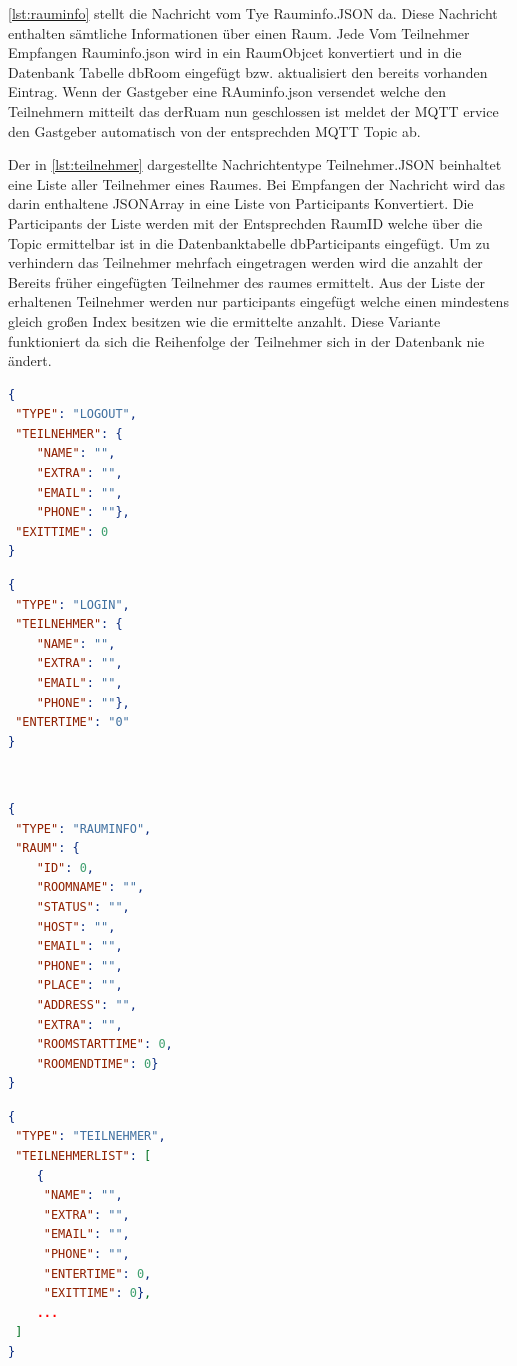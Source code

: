 \cref{lst:rauminfo} stellt die Nachricht vom Tye Rauminfo.JSON da. Diese Nachricht enthalten sämtliche Informationen über einen Raum. Jede Vom Teilnehmer Empfangen Rauminfo.json wird in ein RaumObjcet konvertiert und in die Datenbank Tabelle dbRoom eingefügt bzw. aktualisiert den bereits vorhanden Eintrag. Wenn der Gastgeber eine RAuminfo.json versendet welche den Teilnehmern mitteilt das derRuam nun geschlossen ist meldet der MQTT ervice den Gastgeber automatisch von der entsprechden MQTT Topic ab.

Der in \cref{lst:teilnehmer} dargestellte Nachrichtentype Teilnehmer.JSON beinhaltet eine Liste aller Teilnehmer eines Raumes. Bei Empfangen der Nachricht wird das darin enthaltene JSONArray in eine Liste von Participants Konvertiert. Die Participants der Liste werden mit der Entsprechden RaumID welche über die Topic ermittelbar ist in die Datenbanktabelle dbParticipants eingefügt. Um zu verhindern das Teilnehmer mehrfach eingetragen werden wird die anzahlt der Bereits früher eingefügten Teilnehmer des raumes ermittelt. Aus der Liste der erhaltenen Teilnehmer werden nur participants eingefügt welche einen mindestens gleich großen Index besitzen wie die ermittelte anzahlt. Diese Variante funktioniert da sich die Reihenfolge der Teilnehmer sich in der Datenbank nie ändert.

\begin{minipage}[t]{0.45\linewidth}
\begin{lstlisting}[language=json, label={lst:anmeldung}, caption={anmeldung.json}]
{
 "TYPE": "LOGOUT",
 "TEILNEHMER": {
	"NAME": "",
	"EXTRA": "",
	"EMAIL": "",
	"PHONE": ""},
 "EXITTIME": 0
}
\end{lstlisting}
\end{minipage}
\qquad
\begin{minipage}[t]{0.45\linewidth}
\begin{lstlisting}[language=json,label={lst:abmeldung}, caption={abmeldung.json}]
{
 "TYPE": "LOGIN",
 "TEILNEHMER": {
	"NAME": "",
	"EXTRA": "",
	"EMAIL": "",
	"PHONE": ""},
 "ENTERTIME": "0"
}
\end{lstlisting}
\end{minipage}
\\
\begin{minipage}[t]{0.45\linewidth}
\begin{lstlisting}[language=json, label={lst:rauminfo}, caption={rauminfo.json}]
{
 "TYPE": "RAUMINFO",
 "RAUM": {
	"ID": 0,
	"ROOMNAME": "",
	"STATUS": "",
	"HOST": "",
	"EMAIL": "",
	"PHONE": "",
	"PLACE": "",
	"ADDRESS": "",
	"EXTRA": "",
	"ROOMSTARTTIME": 0,
	"ROOMENDTIME": 0}
}
\end{lstlisting}
\end{minipage}
\qquad
\begin{minipage}[t]{0.45\linewidth}
\begin{lstlisting}[language=json, label={lst:teilnehmer}, caption={teilnehmer.JSON}]
{
 "TYPE": "TEILNEHMER",
 "TEILNEHMERLIST": [
	{
	 "NAME": "",
	 "EXTRA": "",
 	 "EMAIL": "",
 	 "PHONE": "",
 	 "ENTERTIME": 0,
	 "EXITTIME": 0},
	...
 ]
}
\end{lstlisting}
\end{minipage}
\label{sec:MQTT Service}
